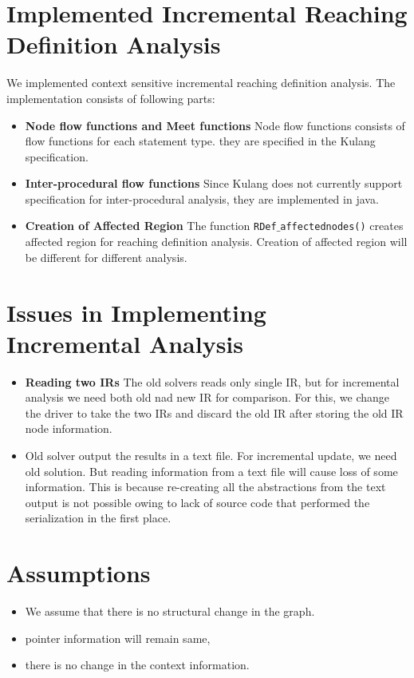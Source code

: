 \documentclass[11pt,a4paper,openright]{report}
\begin{document}
\section{Implemented Incremental Reaching Definition Analysis}
We implemented context sensitive incremental reaching definition analysis. The implementation
consists of following parts:
\begin{itemize}
 \item \textbf{Node flow functions and Meet functions} Node flow functions consists of flow functions for 
 each statement type.  they are specified in the Kulang specification. 
 \item \textbf{Inter-procedural flow functions} Since Kulang does not currently support specification for inter-procedural
 analysis, they are implemented in java.
 \item \textbf{Creation of Affected Region} The function \texttt{RDef$\_$affectednodes()} creates affected region for reaching definition
 analysis. Creation of affected region will be different for different analysis.
\end{itemize}


\section{Issues in Implementing Incremental Analysis}

\begin{itemize}
 \item \textbf{Reading two IRs} The old solvers reads only single IR, but for incremental analysis we need both old nad new IR for comparison.
 For this, we change the driver to take the two IRs and discard the old IR after storing the old IR node information.
 \item Old solver output the results in a text file. For incremental update, we need old solution. 
 But reading information from a text file will cause loss of some information. This is because re-creating all the abstractions from the text output
 is not possible owing to lack of source code that performed the serialization in the first place.
\end{itemize}

\section{Assumptions}
\begin{itemize}
\item We assume that there is no structural change in the graph.
\item pointer information will remain same,
\item there is no change in the context information.
\end{itemize}
\end{document}
